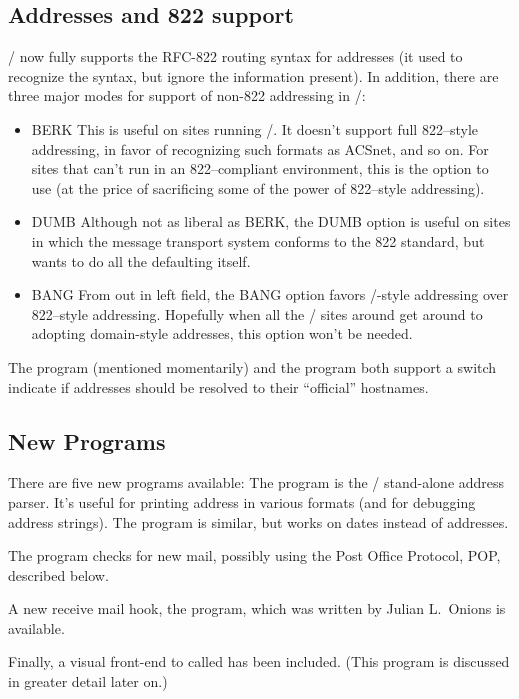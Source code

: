 \subsection*	{Addresses and 822 support}
\MH/ now fully supports the RFC-822 routing syntax for addresses
(it used to recognize the syntax, but ignore the information present).
In addition,
there are three major modes for support of non-822 addressing in \MH/:
\begin{itemize}
\item	BERK\hbreak
This is useful on sites running \SendMail/.
It doesn't support full 822--style addressing,
in favor of recognizing such formats as ACSnet, and so on.
For sites that can't run in an 822--compliant environment,
this is the option to use
(at the price of sacrificing some of the power of 822--style addressing).

\item	DUMB\hbreak
Although not as liberal as BERK,
the DUMB option is useful on sites in which the message transport system
conforms to the 822 standard,
but wants to do all the defaulting itself.

\item	BANG\hbreak
From out in left field,
the BANG option favors \UUCP/-style addressing over 822--style addressing.
Hopefully when all the \UUCP/ sites around get around to adopting domain-style
addresses, this option won't be needed.
\end{itemize}

The  program (mentioned momentarily) and the  program
both support a  switch indicate if addresses should be
resolved to their ``official'' hostnames.

\subsection*	{New Programs}
There are five new programs available:
The  program is the \MH/ stand-alone address parser.
It's useful for printing address in various formats
(and for debugging address strings).
The  program is similar, but works on dates instead of addresses.

The  program checks for new mail,
possibly using the Post Office Protocol, POP, described below.

A new receive mail hook,
the  program,
which was written by Julian L.~Onions is available.

Finally, a visual front-end to  called  has been included.
(This program is discussed in greater detail later on.)

